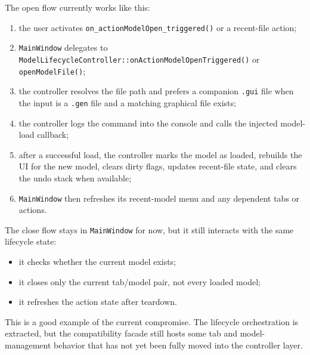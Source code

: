 The open flow currently works like this:
\begin{enumerate}
\item the user activates \texttt{on\_actionModelOpen\_triggered()} or a recent-file action;
\item \texttt{MainWindow} delegates to \texttt{ModelLifecycleController::onActionModelOpenTriggered()} or \texttt{openModelFile()};
\item the controller resolves the file path and prefers a companion \texttt{.gui} file when the input is a \texttt{.gen} file and a matching graphical file exists;
\item the controller logs the command into the console and calls the injected model-load callback;
\item after a successful load, the controller marks the model as loaded, rebuilds the UI for the new model, clears dirty flags, updates recent-file state, and clears the undo stack when available;
\item \texttt{MainWindow} then refreshes its recent-model menu and any dependent tabs or actions.
\end{enumerate}

The close flow stays in \texttt{MainWindow} for now, but it still interacts with the same lifecycle state:
\begin{itemize}
\item it checks whether the current model exists;
\item it closes only the current tab/model pair, not every loaded model;
\item it refreshes the action state after teardown.
\end{itemize}

This is a good example of the current compromise. The lifecycle orchestration is extracted, but the compatibility facade still hosts some tab and model-management behavior that has not yet been fully moved into the controller layer.

